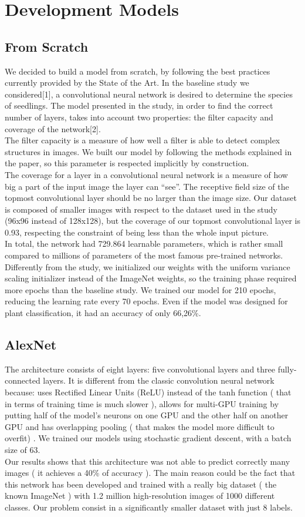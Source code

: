 \documentclass[11pt, oneside]{article}
\begin{document}
\section{Development Models}
\subsection{From Scratch}
We decided to build a model from scratch, by following the best practices currently provided by the State of the Art. In the baseline study we considered[1],  a convolutional neural network is desired to determine the species of seedlings. 
The model presented in the study, in order to find the correct number of layers, takes into account two properties: the filter capacity and coverage of the network[2]. \\
The filter capacity is a measure of how well a filter is able to detect complex structures in images. 
We built our model by following the methods explained in the paper, so this parameter is respected implicitly by construction. \\
The coverage for a layer in a convolutional neural network is a measure of how big a part of the input image the layer can “see”. 
The receptive field size of the topmost convolutional layer should be no larger than the image size. Our dataset is composed of smaller images with respect to the dataset used in the study (96x96 instead of 128x128), but the coverage of our topmost convolutional layer is 0.93, respecting the constraint of being less than the whole input picture. \\
In total, the network had 729.864 learnable parameters, which is rather small compared to millions of parameters of the most famous pre-trained networks. Differently from the study, we initialized our weights with the uniform variance scaling initializer instead of the ImageNet weights, so the training phase required more epochs than the baseline study. We trained our model for 210 epochs, reducing the learning rate every 70 epochs. Even if the model was designed for plant classification, it had an accuracy of only 66,26\%.
\subsection{AlexNet}
The architecture consists of eight layers: five convolutional layers and three fully-connected layers. It is different from the classic convolution neural network because: uses Rectified Linear Units (ReLU) instead of the tanh function ( that in terms of training time is much slower ), allows for multi-GPU training by putting half of the model’s neurons on one GPU and the other half on another GPU and has overlapping pooling ( that makes the model more difficult to overfit) .
We trained our models using stochastic gradient descent, with a batch size of 63.\\
Our results shows that this architecture was not able to predict correctly many images ( it achieves a 40\% of accuracy ). The main reason could be the fact that this network has been developed and trained with a really big dataset ( the known ImageNet ) with  1.2 million high-resolution images of 1000 different classes. Our problem consist in a significantly smaller dataset with just 8 labels.
\end{document}
